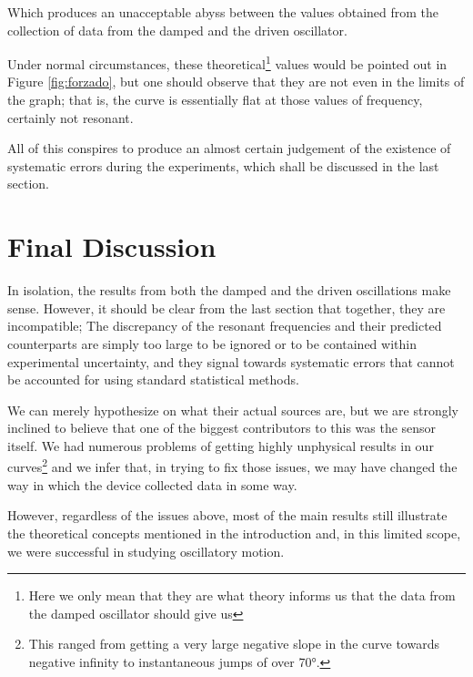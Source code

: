 \documentclass[a4paper,12pt]{article}
\begin{document}
Which produces an unacceptable abyss between the values obtained from the collection of data from the damped and the driven oscillator.

Under normal circumstances, these theoretical\footnote{Here we only mean that they are what theory informs us that the data from the damped oscillator should give us} values would be pointed out in Figure \ref{fig:forzado}, but one should observe that they are not even in the limits of the graph; that is, the curve is essentially flat at those values of frequency, certainly not resonant.

All of this conspires to produce an almost certain judgement of the existence of systematic errors during the experiments, which shall be discussed in the last section.

\section{Final Discussion}
In isolation, the results from both the damped and the driven oscillations make sense. However, it should be clear from the last section that together, they are incompatible; The discrepancy of the resonant frequencies and their predicted counterparts are simply too large to be ignored or to be contained within experimental uncertainty, and they signal towards systematic errors that cannot be accounted for using standard statistical methods.

We can merely hypothesize on what their actual sources are, but we are strongly inclined to believe that one of the biggest contributors to this was the sensor itself. We had numerous problems of getting highly unphysical results in our curves\footnote{This ranged from getting a very large negative slope in the curve towards negative infinity to instantaneous jumps of over 70°.} and we infer that, in trying to fix those issues, we may have changed the way in which the device collected data in some way.

However, regardless of the issues above, most of the main results still illustrate the theoretical concepts mentioned in the introduction and, in this limited scope, we were successful in studying oscillatory motion.

\printbibliography
\end{document}
